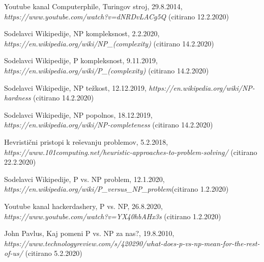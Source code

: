 \documentclass[11pt]{article}
\begin{document}
\begin{thebibliography}{9}
	\begin{flushleft}
    Youtube kanal Computerphile, Turingov stroj, 29.8.2014, 
	\textit{https://www.youtube.com/watch?v=dNRDvLACg5Q} (citirano 12.2.2020)
	\end{flushleft}
	
	\begin{flushleft}
	Sodelavci Wikipedije, NP kompleksnost, 2.2.2020, 
	\textit{https://en.wikipedia.org/wiki/NP\_(complexity)}	(citirano 14.2.2020)
	\end{flushleft}
		
	\begin{flushleft}
	Sodelavci Wikipedije, P kompleksnost, 9.11.2019, 
	\textit{https://en.wikipedia.org/wiki/P\_(complexity)} (citirano 14.2.2020)
	\end{flushleft}
		
	\begin{flushleft}
	Sodelavci Wikipedije, NP težkost, 12.12.2019, 
	\textit{https://en.wikipedia.org/wiki/NP-hardness} (citirano 14.2.2020)
	\end{flushleft}
		
	\begin{flushleft}	
	Sodelavci Wikipedije, NP popolnos, 18.12.2019, 
	\textit{https://en.wikipedia.org/wiki/NP-completeness} (citirano 14.2.2020)
	\end{flushleft}
	
	\begin{flushleft}	
	Hevristični pristopi k reševanju problemov, 5.2.2018, 
	\textit{https://www.101computing.net/heuristic-approaches-to-problem-solving/} (citirano 22.2.2020)
	\end{flushleft}
		
	\begin{flushleft}
	Sodelavci Wikipedije, P vs. NP problem, 12.1.2020, 
	\textit{https://en.wikipedia.org/wiki/P\_versus\_NP\_problem}(citirano 1.2.2020)
	\end{flushleft}
		
	\begin{flushleft}	
	Youtube kanal hackerdashery, P vs. NP, 26.8.2020, 
	\textit{https://www.youtube.com/watch?v=YX40hbAHx3s} (citirano 1.2.2020)
	\end{flushleft}
	
	\begin{flushleft}
	John Pavlus, Kaj pomeni P vs. NP za nas?, 19.8.2010, 
	\textit{https://www.technologyreview.com/s/420290/what-does-p-vs-np-mean-for-the-rest-of-us/} (citirano 5.2.2020)
	\end{flushleft}
	

\end{thebibliography}
\end{document}
